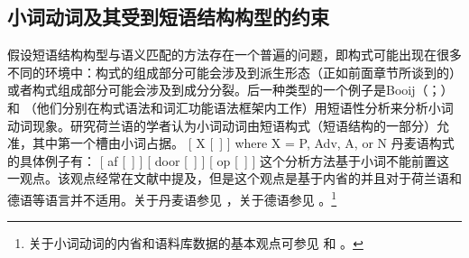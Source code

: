 \begin{exe}
\begin{xlist}[iv.]
\begin{exe}
\begin{xlist}[iv.]
\subsection{小词动词及其受到短语结构构型的约束}
\label{sec-particle-verbs-phrasal}

假设短语结构构型与语义匹配的方法存在一个普遍的问题，即构式可能出现在很多不同的环境中：构式的组成部分可能会涉及到派生形态（正如前面章节所谈到的）或者构式组成部分可能会涉及到成分分裂。后一种类型的一个例子是Booij（\citeyear[\S~2]{Booij2002a}；\citeyear{Booij2012a-u}）和 \citet{Blom2005a}（他们分别在构式语法\indexcxg 和词汇功能语法\indexlfg 框架内工作）用短语性分析来分析小词动词现象。研究荷兰语的学者认为小词动词由短语构式（短语结构的一部分）允准，其中第一个槽由小词占据。
\ea
{}[ X [~] ] where X = P, Adv, A, or N
\z
丹麦语构式的具体例子有：
\eal
\label{particle-konstruktionen}
\ex {}[ af   [~] ]
\ex {}[ door [~] ]
\ex {}[ op   [~] ]
\zl 
这个分析方法基于小词不能前置这一观点。该观点经常在文献中提及，但是这个观点是基于内省的并且对于荷兰语和德语等语言并不适用。关于丹麦语参见 ，关于德语参见 。\footnote{%
关于小词动词的内省和语料库数据的基本观点可参见 和 。
} 

\end{xlist}
\end{exe}
\end{xlist}
\end{exe}
